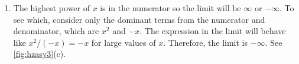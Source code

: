 \begin{example}
\begin{enumerate}
\begin{enumerate}
\begin{align*}
				&=\lim_{x\to \infty}\frac{x^2/x-1/x}{3/x-x/x}\\
				&=\lim_{x\to \infty}\frac{x-1/x}{3/x-1}\\
				&=-\infty
			\end{align*}
		\item The highest power of $x$ is in the numerator so the limit will be $\infty$ or $-\infty$.  To see which, consider only the dominant terms from the numerator and denominator, which are $x^2$ and $-x$.  The expression in the limit will behave like $x^2/(-x)=-x$ for large values of $x$.  Therefore, the limit is $-\infty$. See \autoref{fig:hzasy3}(c).
	\end{enumerate}
\end{enumerate}
\end{example}



